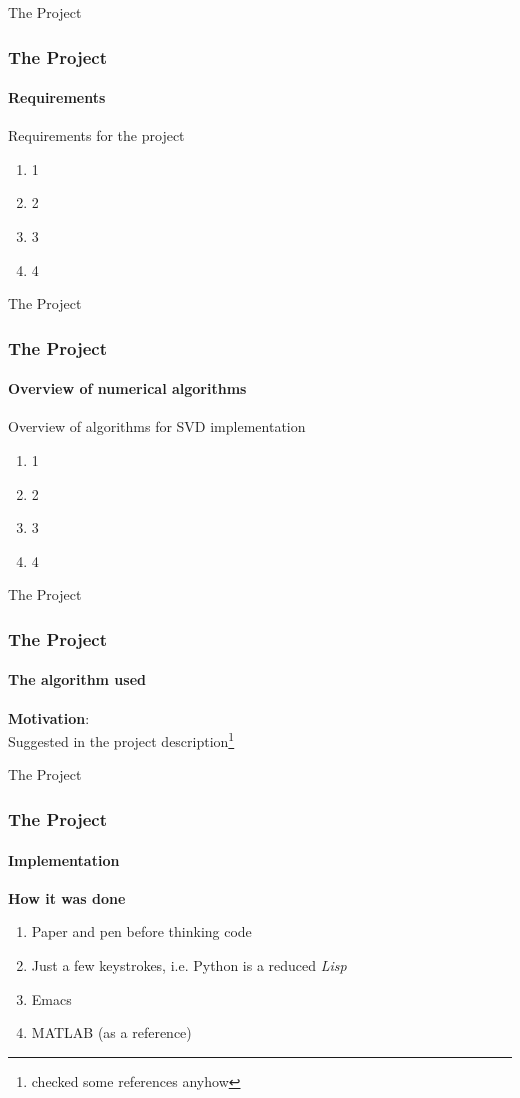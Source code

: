 \documentclass{beamer}
\begin{document}

\begin{frame}{The Project}

\frametitle{The Project}
\framesubtitle{Requirements}

Requirements for the project
\begin{enumerate}
\item 1
\item 2
\item 3
\item 4
\end{enumerate}

\end{frame}


\begin{frame}{The Project}

\frametitle{The Project}
\framesubtitle{Overview of numerical algorithms}

Overview of algorithms for SVD implementation
\begin{enumerate}
\item 1
\item 2
\item 3
\item 4
\end{enumerate}

\end{frame}


\begin{frame}{The Project}

\frametitle{The Project}
\framesubtitle{The algorithm used}

\textbf{Motivation}:\\ Suggested in the project description\footnote{checked some references anyhow}
\end{frame}


\begin{frame}{The Project}

\frametitle{The Project}
\framesubtitle{Implementation}

\textbf{How it was done}
\begin{enumerate}
\item Paper and pen before thinking code
\item Just a few keystrokes, i.e. Python is a reduced \emph{Lisp}
\item Emacs
\item MATLAB (as a reference)
\end{enumerate}


\end{frame}
\end{document}
